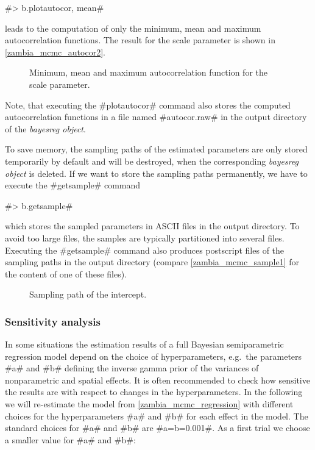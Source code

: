 #> b.plotautocor, mean#

leads to the computation of only the minimum, mean and maximum
autocorrelation functions. The result for the scale parameter is
shown in \autoref{zambia_mcmc_autocor2}.

\begin{figure}[ht]
\begin{center}
{\it\caption{Minimum, mean and maximum autocorrelation function
for the scale parameter.\label{zambia_mcmc_autocor2}}}
\end{center}
\end{figure}

Note, that executing the #plotautocor# command also stores the
computed autocorrelation functions in a file named #autocor.raw#
in the output directory of the {\it bayesreg object}.

To save memory, the sampling paths of the estimated parameters are
only stored temporarily by default and will be destroyed, when the
corresponding {\em bayesreg object} is deleted. If we want to
store the sampling paths permanently, we have to execute the
#getsample# command

#> b.getsample#

which stores the sampled parameters in ASCII files in the output
directory. To avoid too large files, the samples are typically
partitioned into several files. Executing the #getsample# command
also produces postscript files of the sampling paths in the output
directory (compare \autoref{zambia_mcmc_sample1} for the content
of one of these files).

\begin{figure}[ht]
\begin{center}
{\it\caption{Sampling path of the
intercept.\label{zambia_mcmc_sample1}}}
\end{center}
\end{figure}

\subsubsection{Sensitivity analysis}\label{zambia_mcmc_sensitivity}

In some situations the estimation results of a full Bayesian
semiparametric regression model depend on the choice of
hyperparameters, e.g.~the parameters #a# and #b# defining the
inverse gamma prior of the variances of nonparametric and spatial
effects. It is often recommended to check how sensitive the
results are with respect to changes in the hyperparameters. In the
following we will re-estimate the model from
\autoref{zambia_mcmc_regression} with different choices for the
hyperparameters #a# and #b# for each effect in the model. The
standard choices for #a# and #b# are #a=b=0.001#. As a first trial
we choose a smaller value for #a# and #b#:

